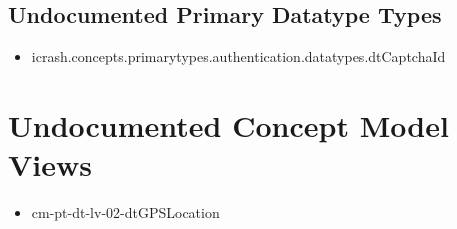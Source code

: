 \subsection[Undocumented Primary Datatype Types]{Undocumented Primary Datatype Types}
\begin{itemize}
\item icrash.concepts.primarytypes.authentication.datatypes.dtCaptchaId 
\end{itemize}














\section[Undocumented Concept Model Views]{Undocumented Concept Model Views}
\begin{itemize}
\item cm-pt-dt-lv-02-dtGPSLocation 
\end{itemize}


